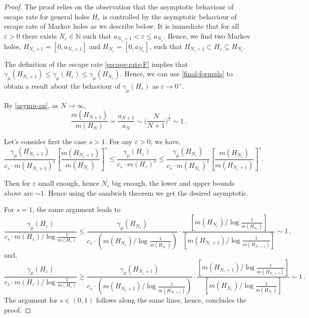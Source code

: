 \documentclass{amsart}
\theoremstyle{definition}
\theoremstyle{remark}
\theoremstyle{definition}
\numberwithin{equation}{section}
\newcommand{\N}{\mathbb N}
\newcommand{\eps}{\varepsilon}
\begin{document}
\begin{proof}
The proof relies on the observation that the asymptotic behaviour of escape rate for general holes $H_\eps$ is controlled by the asymptotic behaviour of escape rate of Markov holes as we describe below. It is immediate that for all $\eps>0$ there exists $N_\eps \in \N$ such that $a_{N_\eps+1} < \eps \le a_{N_\eps}$. Hence, we find two Markov holes, $H_{N_\eps+1} = [0,a_{N_\eps+1}]$ and $H_{N_\eps} = [0,a_{N_\eps}]$, such that $H_{N_\eps+1} \subset H_\eps \subseteq H_{N_\eps}$. 

The definition of the escape rate \eqref{escape-rate-F} implies that $\gamma_\mu(H_{N_\eps+1})\le \gamma_\mu(H_\eps)\le \gamma_\mu(H_{N_\eps})$. Hence, we can use \eqref{final-formula} to obtain a result about the behaviour of $\gamma_\mu(H_\eps)$ as $\eps\to 0^+$.

By \eqref{asymp-an}, as $N\to \infty$,
\[
\frac{m(H_{N+1})}{m(H_N)} = \frac{a_{N+1}}{a_N} \sim \Big( \frac{N}{N+1} \Big)^{\frac 1s} \sim 1\, .
\]

Let's consider first the case $s> 1$. For any $\eps >0$, we have,
\[
 \frac{\gamma_\mu(H_{N_\eps+1})}{c_s\cdot m(H_{N_\eps+1})^s}\left[ \frac{m(H_{N_\eps+1})}{m(H_{N_\eps})} \right]^s \le \frac{\gamma_\mu(H_\eps)}{c_s \cdot m(H_\eps)^s} \le \frac{\gamma_\mu(H_{N_\eps})}{c_s\cdot m(H_{N_\eps})^s} \left[ \frac{m(H_{N_\eps})}{m(H_{N_\eps +1})} \right]^s .
\]

Then for $\eps$ small enough, hence $N_\eps$ big enough, the lower and upper bounds above are $\sim 1$. Hence using the sandwich theorem we get the desired asymptotic.
 

For $s=1$, the same argument leads to 
\[
\frac{\gamma_\mu(H_\eps)}{c_s \cdot m(H_\eps)/\log \frac{1}{m(H_\eps)}} \le \frac{\gamma_\mu(H_{N_\eps})}{c_s \cdot \left( m(H_{N_\eps}) / \log \frac{1}{m(H_{N_\eps})} \right)} \cdot \frac{\left[ m(H_{N_\eps}) / \log \frac{1}{m(H_{N_\eps})}\right]}{\left[ m(H_{N_\eps+1}) / \log \frac{1}{m(H_{N_\eps+1})}\right]} \sim 1 \, ,
\]
and,
\[
\frac{\gamma_\mu(H_\eps)}{c_s \cdot m(H_\eps)/\log \frac{1}{m(H_\eps)}} \ge \frac{\gamma_\mu(H_{N_\eps+1})}{c_s \cdot \left( m(H_{N_\eps+1}) / \log \frac{1}{m(H_{N_\eps+1})} \right)} \cdot \frac{\left[ m(H_{N_\eps+1}) / \log \frac{1}{m(H_{N_\eps+1})}\right]}{\left[ m(H_{N_\eps}) / \log \frac{1}{m(H_{N_\eps})}\right]} \sim 1 \,.
\]
The argument for $s\in (0,1)$ follows along the same lines, hence, concludes the proof.
\end{proof}
\end{document}
